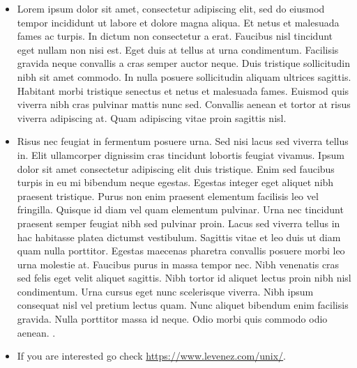 \documentclass[article]{seminar}
\newcommand{\sltitle}[1]{{\centering\textbf{\Large #1}
    \vskip 2em plus 0pt minus 2em\par}} %
\begin{document}



\begin{itemize}
\item Lorem ipsum dolor sit amet, consectetur adipiscing elit, sed do eiusmod
tempor incididunt ut labore et dolore magna aliqua. Et netus et malesuada fames
ac turpis. In dictum non consectetur a erat. Faucibus nisl tincidunt eget nullam
non nisi est. Eget duis at tellus at urna condimentum. Facilisis gravida neque
convallis a cras semper auctor neque. Duis tristique sollicitudin nibh sit amet
commodo. In nulla posuere sollicitudin aliquam ultrices sagittis. Habitant morbi
tristique senectus et netus et malesuada fames. Euismod quis viverra nibh cras
pulvinar mattis nunc sed. Convallis aenean et tortor at risus viverra adipiscing
at. Quam adipiscing vitae proin sagittis nisl.
\item Risus nec feugiat in fermentum posuere urna. Sed nisi lacus sed viverra
tellus in. Elit ullamcorper dignissim cras tincidunt lobortis feugiat vivamus.
Ipsum dolor sit amet consectetur adipiscing elit duis tristique. Enim sed
faucibus turpis in eu mi bibendum neque egestas. Egestas integer eget aliquet
nibh praesent tristique. Purus non enim praesent elementum facilisis leo vel
fringilla. Quisque id diam vel quam elementum pulvinar. Urna nec tincidunt
praesent semper feugiat nibh sed pulvinar proin. Lacus sed viverra tellus in hac
habitasse platea dictumst vestibulum. Sagittis vitae et leo duis ut diam quam
nulla porttitor. Egestas maecenas pharetra convallis posuere morbi leo urna
molestie at. Faucibus purus in massa tempor nec. Nibh venenatis cras sed felis
eget velit aliquet sagittis. Nibh tortor id aliquet lectus proin nibh nisl
condimentum. Urna cursus eget nunc scelerisque viverra. Nibh ipsum consequat
nisl vel pretium lectus quam. Nunc aliquet bibendum enim facilisis gravida.
Nulla porttitor massa id neque. Odio morbi quis commodo odio aenean.
\pageref{BAR}.
\item If you are interested go check \url{https://www.levenez.com/unix/}.
\end{itemize}



\end{document}
